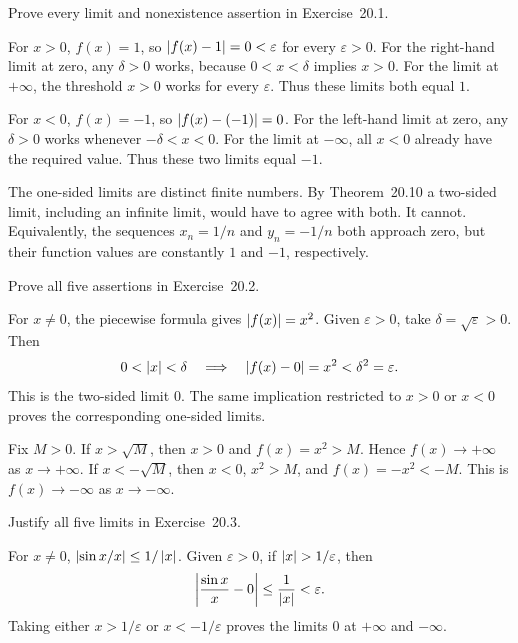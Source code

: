 \goal Prove every limit and nonexistence assertion in Exercise~20.1.

For $x>0$, $f(x)=1$, so $\left|f(x)-1\right|=0<\varepsilon$
for every $\varepsilon>0$. For the right-hand limit at zero,
any $\delta>0$ works, because $0<x<\delta$ implies $x>0$.
For the limit at $+\infty$, the threshold $x>0$ works for every
$\varepsilon$. Thus these limits both equal $1$.

For $x<0$, $f(x)=-1$, so $\left|f(x)-(-1)\right|=0$.
For the left-hand limit at zero, any $\delta>0$ works whenever
$-\delta<x<0$. For the limit at $-\infty$, all $x<0$ already
have the required value. Thus these two limits equal $-1$.

The one-sided limits are distinct finite numbers. By
Theorem~20.10 a two-sided limit, including an infinite limit,
would have to agree with both. It cannot. Equivalently, the
sequences $x_n=1/n$ and $y_n=-1/n$ both approach zero, but their
function values are constantly $1$ and $-1$, respectively.

\goal Prove all five assertions in Exercise~20.2.

For $x\ne0$, the piecewise formula gives $\left|f(x)\right|=x^2$.
Given $\varepsilon>0$, take $\delta=\sqrt\varepsilon>0$.
Then
\[
 0<\left|x\right|<\delta\quad\Longrightarrow\quad
 \left|f(x)-0\right|=x^2<\delta^2=\varepsilon.
\]
This is the two-sided limit $0$. The same implication restricted
to $x>0$ or $x<0$ proves the corresponding one-sided limits.

Fix $M>0$. If $x>\sqrt M$, then $x>0$ and
$f(x)=x^2>M$. Hence $f(x)\to+\infty$ as $x\to+\infty$.
If $x<-\sqrt M$, then $x<0$, $x^2>M$, and
$f(x)=-x^2<-M$. This is $f(x)\to-\infty$ as $x\to-\infty$.

\goal Justify all five limits in Exercise~20.3.

For $x\ne0$, $\left|\sin x/x\right|\le1/\left|x\right|$.
Given $\varepsilon>0$, if $\abs{x}>1/\varepsilon$, then
\[
 \left|\frac{\sin x}{x}-0\right|\le\frac1{\left|x\right|}<\varepsilon.
\]
Taking either $x>1/\varepsilon$ or $x<-1/\varepsilon$ proves
the limits $0$ at $+\infty$ and $-\infty$.

